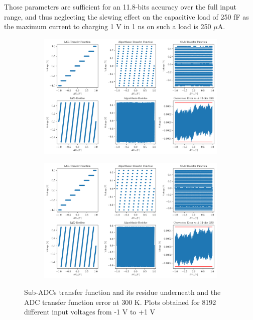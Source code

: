 Those parameters are sufficient for an 11.8-bits accuracy over the full input range, and thus neglecting the slewing effect on the capacitive load of 250 fF as the maximum current to charging 1 V in 1 ns on such a load is 250 $\mu$A.

\begin{figure}[htp]
	\centering
	\begin{subfigure}[b]{0.9\textwidth}
		\centering
		\includegraphics[width=\textwidth]{Chapter4/Figs/results/algo_feedback/adc-osr5-70db-750MHz-fb1.pdf}
	\end{subfigure}
	\begin{subfigure}[b]{0.9\textwidth}
		\centering
		\includegraphics[width=\textwidth]{Chapter4/Figs/results/algo_feedback/adc-osr5-70db-750MHz-fb12.pdf}
	\end{subfigure}
	\caption{Sub-ADCs transfer function and its residue underneath and the ADC transfer function error at 300 K. Plots obtained for 8192 different input voltages from -1 V to +1 V}
	\label{fig:algorithmic-feedback-impact}
\end{figure}


